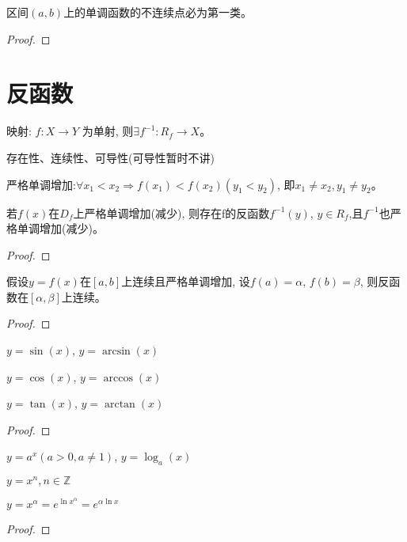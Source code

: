 \begin{proposition}
    区间$(a, b)$上的单调函数的不连续点必为第一类。    
\end{proposition}
\begin{proof}
    
\end{proof}
\section{反函数}
映射: $f: X \to Y$ 为单射, 则$\exists f^{-1}: R_f \to X$。

存在性、连续性、可导性(可导性暂时不讲)

严格单调增加:$\forall x_1 < x_2 \Rightarrow f(x_1) < f(x_2)(y_1 < y_2)$, 即$x_1 \neq x_2, y_1 \neq y_2$。
\begin{theorem}[反函数存在定理]\label{theorem:inverse-func-exists}
    若$f(x)$在$D_f$上严格单调增加(减少), 则存在f的反函数$f^{-1}(y)$, $y \in R_f $,且$f^{-1}$也严格单调增加(减少)。
\end{theorem}
\begin{proof}
    
\end{proof}

\begin{theorem}[反函数连续性定理]
    假设$y = f(x)$在$[a, b]$上连续且严格单调增加, 设$f(a)=\alpha$, $f(b)=\beta$, 则反函数在$[\alpha, \beta]$上连续。
\end{theorem}
\begin{proof}
    
\end{proof}

\begin{proposition}
    $y = \sin(x)$, $y = \arcsin(x)$

    $y = \cos(x)$, $y = \arccos(x)$

    $y = \tan(x)$, $y = \arctan(x)$
\end{proposition}
\begin{proof}
    
\end{proof}
\begin{proposition}
    $y = a^x(a > 0, a \neq 1)$, $y = \log_a(x)$

    $y = x^n, n \in \mathbb{Z}$

    $y = x^\alpha = e^{\ln x^\alpha} = e^{\alpha \ln x}$
\end{proposition}
\begin{proof}
    
\end{proof}

